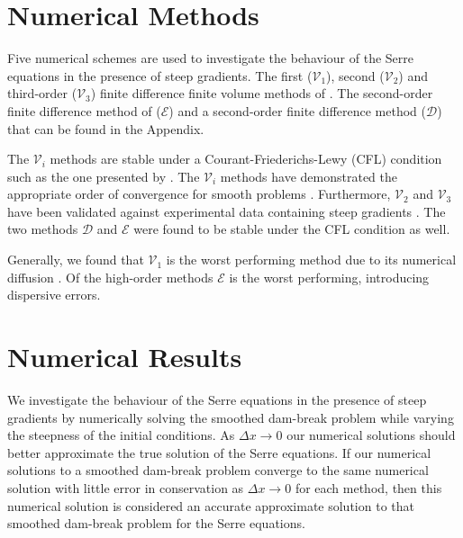 \documentclass[times]{elsarticle}
\begin{document}
\section{Numerical Methods}
\label{sec:nummeth}
Five numerical schemes are used to investigate the behaviour of the Serre equations in the presence of steep gradients. The first ($\mathcal{V}_1$), second ($\mathcal{V}_2$) and third-order ($\mathcal{V}_3$) finite difference finite volume methods of  \citet{Zoppou-etal-2017}. The second-order finite difference method of \citet{El-etal-2006} ($\mathcal{E}$) and a second-order finite difference method ($\mathcal{D}$) that can be found in the Appendix.

The $\mathcal{V}_i$ methods are stable under a Courant-Friederichs-Lewy (CFL) condition such as the one presented by \citet{Harten-etal-1983-357}. The $\mathcal{V}_i$ methods have demonstrated the appropriate order of convergence for smooth problems \cite{Zoppou-etal-2017}. Furthermore, $\mathcal{V}_2$ and $\mathcal{V}_3$ have been validated against experimental data containing steep gradients \cite{Zoppou-etal-2017}. The two methods $\mathcal{D}$ and $\mathcal{E}$ were found to be stable under the CFL condition as well.

Generally, we found that $\mathcal{V}_1$ is the worst performing method due to its numerical diffusion \cite{Zoppou-etal-2017}. Of the high-order methods $\mathcal{E}$ is the worst performing, introducing dispersive errors.

\section{Numerical Results}
\label{section:NumRes}
We investigate the behaviour of the Serre equations in the presence of steep gradients by numerically solving the smoothed dam-break problem while varying the steepness of the initial conditions. As $\Delta x \rightarrow 0$ our numerical solutions should better approximate the true solution of the Serre equations. If our numerical solutions to a smoothed dam-break problem converge to the same numerical solution with little error in conservation as $\Delta x \rightarrow 0$ for each method, then this numerical solution is considered an accurate approximate solution to that smoothed dam-break problem for the Serre equations.
\end{document}

